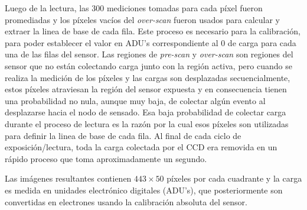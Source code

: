 Luego de la lectura, las $300$ mediciones tomadas para cada píxel fueron promediadas y los píxeles vacíos del \textit{over-scan} fueron usados para calcular y extraer la linea de base de cada fila. Este proceso es necesario para la calibración, para poder establecer el valor en ADU's correspondiente al $0$ de carga para cada una de las filas del sensor. Las regiones de \textit{pre-scan} y \textit{over-scan} son regiones del sensor que no están colectando carga junto con la región activa, pero cuando se realiza la medición de los píxeles y las cargas son desplazadas secuencialmente, estos píxeles atraviesan la región del sensor expuesta y en consecuencia tienen una probabilidad no nula, aunque muy baja, de colectar algún evento al desplazarse hacia el nodo de sensado. Esa baja probabilidad de colectar carga durante el proceso de lectura es la razón por la cual esos píxeles son utilizadas para definir la linea de base de cada fila. Al final de cada ciclo de exposición/lectura, toda la carga colectada por el CCD era removida en un rápido proceso que toma aproximadamente un segundo.

Las imágenes resultantes contienen $443 \times 50$ píxeles por cada cuadrante y la carga es medida en unidades electrónico digitales (ADU's), que posteriormente son convertidas en electrones usando la calibración absoluta del sensor.